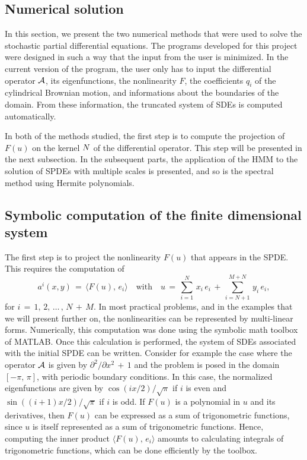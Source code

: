\subsection{Numerical solution} 
\label{sec:Numerical solution}
In this section, we present the two numerical methods that were used to solve the stochastic partial differential equations.
The programs developed for this project were designed in such a way that the input from the user is minimized.
In the current version of the program, the user only has to input the differential operator $\mathcal A$, its eigenfunctions, the nonlinearity $F$, the coefficients $q_i$ of the cylindrical Brownian motion, and informations about the boundaries of the domain.
From these information, the truncated system of SDEs is computed automatically.

In both of the methods studied, the first step is to compute the projection of $F(u)$
on the kernel $\space N$ of the differential operator. This step will be presented
in the next subsection. In the subsequent parts, the application of the HMM to
the solution of SPDEs with multiple scales is presented, and so is the spectral
method using Hermite polynomials.

\subsection{Symbolic computation of the finite dimensional system}
\label{sub:Projection of F(u) on  N}
The first step is to project the nonlinearity $F(u)$ that appears in the SPDE.
This requires the computation of
$$
a^i(x,y) \,=\, \langle F(u),\, e_i\rangle \quad
\text{with} \quad u \,=\, \sum^{N}_{i=1} \, x_i \, e_i \,+\,
\sum^{M+N}_{i=N+1}\, y_i \, e_i,
$$
for $i \,=\, 1,\,2,\,{\dots}\,,\, N \,+\, M$. In most practical problems, and in the examples
that we will present further on,  the nonlinearities can be represented by
multi-linear forms.  Numerically, this computation was done using the symbolic
math toolbox of MATLAB. Once this calculation is performed, the system of SDEs
associated with the initial SPDE can be written. Consider for example the case
where the operator $\mathcal A$ is given by ${\partial}^2/{\partial}x^2 \,+\,1$ and the problem
is posed in the domain $[-{\pi},\,{\pi}]$, with periodic boundary conditions. In this
case, the normalized eigenfunctions are given by $\cos(ix/2)/\sqrt{\pi}$ if $i$ is
even and $\sin((i+1)x/2)/\sqrt{\pi}$ if $i$ is odd. If $F(u)$ is a polynomial in
$u$ and its derivatives, then $F(u)$ can be expressed as a sum of trigonometric
functions, since $u$ is
itself
represented as a sum of trigonometric functions. Hence, computing the inner
product $\langle F(u),\, e_i \rangle$ amounts to calculating integrals of
trigonometric functions, which can be done efficiently by the toolbox.


